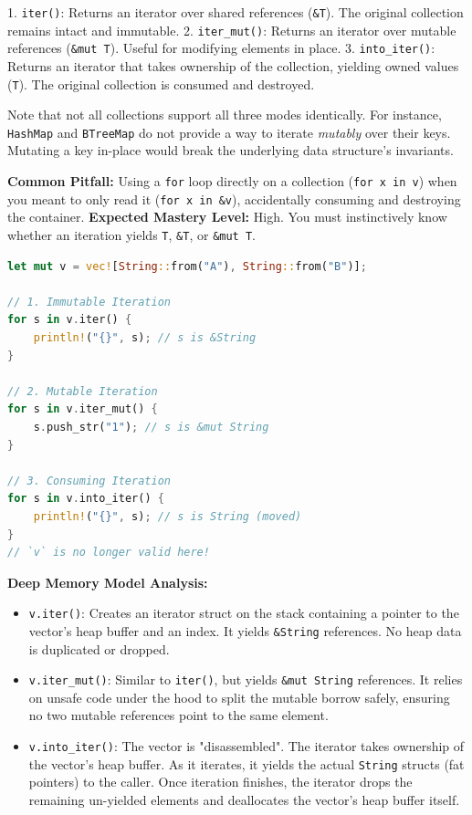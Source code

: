 1. \texttt{iter()}: Returns an iterator over shared references (\texttt{\&T}). The original collection remains intact and immutable.
2. \texttt{iter\_mut()}: Returns an iterator over mutable references (\texttt{\&mut T}). Useful for modifying elements in place.
3. \texttt{into\_iter()}: Returns an iterator that takes ownership of the collection, yielding owned values (\texttt{T}). The original collection is consumed and destroyed.

\begin{notebox}
Note that not all collections support all three modes identically. For instance, \texttt{HashMap} and \texttt{BTreeMap} do not provide a way to iterate \textit{mutably} over their keys. Mutating a key in-place would break the underlying data structure's invariants.
\end{notebox}

\begin{examprioritybox}
\textbf{Common Pitfall:} Using a \texttt{for} loop directly on a collection (\texttt{for x in v}) when you meant to only read it (\texttt{for x in \&v}), accidentally consuming and destroying the container.
\textbf{Expected Mastery Level:} High. You must instinctively know whether an iteration yields \texttt{T}, \texttt{\&T}, or \texttt{\&mut T}.

\begin{lstlisting}[language=Rust]
let mut v = vec![String::from("A"), String::from("B")];

// 1. Immutable Iteration
for s in v.iter() {
    println!("{}", s); // s is &String
}

// 2. Mutable Iteration
for s in v.iter_mut() {
    s.push_str("1"); // s is &mut String
}

// 3. Consuming Iteration
for s in v.into_iter() {
    println!("{}", s); // s is String (moved)
}
// `v` is no longer valid here!
\end{lstlisting}

\textbf{Deep Memory Model Analysis:} 
\begin{itemize}
    \item \texttt{v.iter()}: Creates an iterator struct on the stack containing a pointer to the vector's heap buffer and an index. It yields \texttt{\&String} references. No heap data is duplicated or dropped.
    \item \texttt{v.iter\_mut()}: Similar to \texttt{iter()}, but yields \texttt{\&mut String} references. It relies on unsafe code under the hood to split the mutable borrow safely, ensuring no two mutable references point to the same element.
    \item \texttt{v.into\_iter()}: The vector is "disassembled". The iterator takes ownership of the vector's heap buffer. As it iterates, it yields the actual \texttt{String} structs (fat pointers) to the caller. Once iteration finishes, the iterator drops the remaining un-yielded elements and deallocates the vector's heap buffer itself.
\end{itemize}
\end{examprioritybox}

